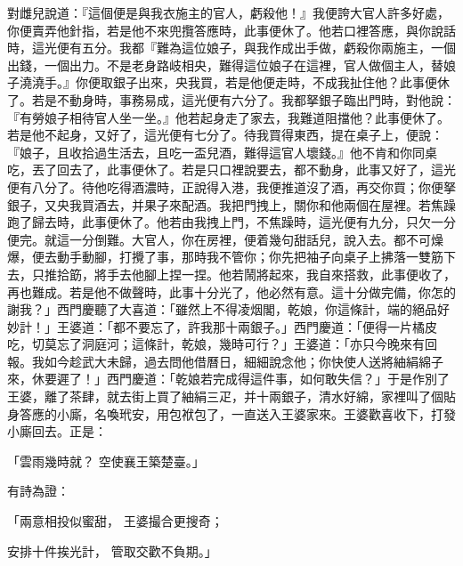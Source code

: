 對雌兒說道：『這個便是與我衣施主的官人，虧殺他！』我便誇大官人許多好處，你便賣弄他針指，若是他不來兜攬答應時，此事便休了。他若口裡答應，與你說話時，這光便有五分。我都『難為這位娘子，與我作成出手做，虧殺你兩施主，一個出錢，一個出力。不是老身路岐相央，難得這位娘子在這裡，官人做個主人，替娘子澆澆手。』你便取銀子出來，央我買，若是他便走時，不成我扯住他？此事便休了。若是不動身時，事務易成，這光便有六分了。我都拏銀子臨出門時，對他說：『有勞娘子相待官人坐一坐。』他若起身走了家去，我難道阻擋他？此事便休了。若是他不起身，又好了，這光便有七分了。待我買得東西，提在桌子上，便說：『娘子，且收拾過生活去，且吃一盃兒酒，難得這官人壞錢。』他不肯和你同桌吃，丟了回去了，此事便休了。若是只口裡說要去，都不動身，此事又好了，這光便有八分了。待他吃得酒濃時，正說得入港，我便推道沒了酒，再交你買；你便拏銀子，又央我買酒去，并果子來配酒。我把門拽上，關你和他兩個在屋裡。若焦躁跑了歸去時，此事便休了。他若由我拽上門，不焦躁時，這光便有九分，只欠一分便完。就這一分倒難。大官人，你在房裡，便着幾句甜話兒，說入去。都不可燥爆，便去動手動腳，打攪了事，那時我不管你；你先把袖子向桌子上拂落一雙筋下去，只推拾筯，將手去他腳上捏一捏。他若鬧將起來，我自來搭救，此事便收了，再也難成。若是他不做聲時，此事十分光了，他必然有意。這十分做完備，你怎的謝我？」西門慶聽了大喜道：「雖然上不得凌烟閣，乾娘，你這條計，端的絕品好妙計！」王婆道：「都不要忘了，許我那十兩銀子。」西門慶道：「便得一片橘皮吃，切莫忘了洞庭河；這條計，乾娘，幾時可行？」王婆道：「亦只今晚來有回報。我如今趁武大未歸，過去問他借曆日，細細說念他；你快使人送將紬絹綿子來，休要遲了！」西門慶道：「乾娘若完成得這件事，如何敢失信？」于是作別了王婆，離了茶肆，就去街上買了紬絹三疋，并十兩銀子，清水好綿，家裡叫了個貼身答應的小廝，名喚玳安，用包袱包了，一直送入王婆家來。王婆歡喜收下，打發小廝回去。正是：

「雲雨幾時就？  空使襄王築楚臺。」

有詩為證：

「兩意相投似蜜甜，  王婆撮合更搜奇；

安排十件挨光計，  管取交歡不負期。」

